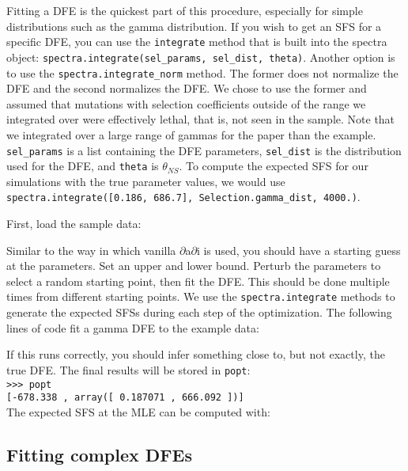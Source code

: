 \documentclass[11pt]{article}
\begin{document}
Fitting a DFE is the quickest part of this procedure, especially for simple distributions such as the gamma distribution. If you wish to get an SFS for a specific DFE, you can use the \texttt{integrate} method that is built into the spectra object: \texttt{spectra.integrate(sel\_params, sel\_dist, theta)}. Another option is to use the \texttt{spectra.integrate\_norm} method. The former does not normalize the DFE and the second normalizes the DFE. We chose to use the former and assumed that mutations with selection coefficients outside of the range we integrated over were effectively lethal, that is, not seen in the sample. Note that we integrated over a large range of gammas for the paper than the example. \texttt{sel\_params} is a list containing the DFE parameters, \texttt{sel\_dist} is the distribution used for the DFE, and \texttt{theta} is $\theta_{NS}$. To compute the expected SFS for our simulations with the true parameter values, we would use \texttt{spectra.integrate([0.186, 686.7], Selection.gamma\_dist, 4000.)}.

First, load the sample data:



Similar to the way in which vanilla $\partial$a$\partial$i is used, you should have a starting guess at the parameters. Set an upper and lower bound. Perturb the parameters to select a random starting point, then fit the DFE. This should be done multiple times from different starting points. We use the \texttt{spectra.integrate} methods to generate the expected SFSs during each step of the optimization. The following lines of code fit a gamma DFE to the example data:



If this runs correctly, you should infer something close to, but not exactly, the true DFE. The final results will be stored in \texttt{popt}: \\

\texttt{>>> popt} \\
\texttt{[-678.338    , array([ 0.187071   ,  666.092    ])]} \\

The expected SFS at the MLE can be computed with:



\subsection{Fitting complex DFEs}
\end{document}
